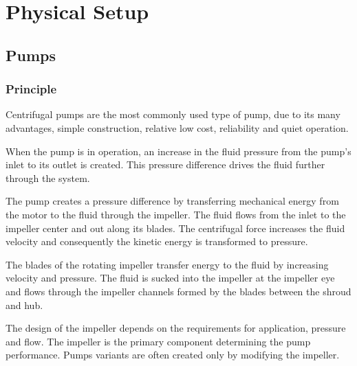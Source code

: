 \chapter{Physical Setup}\label{ch:physsetup}
\section{Pumps}
\subsection{Principle}
Centrifugal pumps are the most commonly used type of pump, due to its many advantages, simple construction, relative low 
cost, reliability and quiet operation.

When the pump is in operation, an increase in the fluid pressure from the pump's inlet to its outlet is created. This pressure 
difference drives the fluid further through the system.

The pump creates a pressure difference by transferring mechanical energy from the motor to the fluid through the impeller. The fluid 
flows from the inlet to the impeller center and out along its blades.
The centrifugal force increases the fluid velocity and consequently the kinetic energy is transformed to pressure. 

The blades of the rotating impeller transfer energy to the fluid by increasing velocity and pressure. The fluid is sucked into the 
impeller at the impeller eye and flows through the impeller channels formed by the blades between the shroud and hub.

The design of the impeller depends on the requirements for application, pressure and flow. The impeller is the primary component 
determining the pump performance. Pumps variants are often created only by modifying the impeller.


